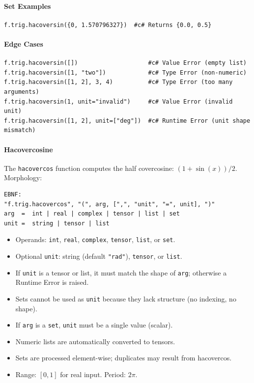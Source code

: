 \paragraph{Set Examples}
\begin{verbatim}
f.trig.hacoversin({0, 1.570796327})  #c# Returns {0.0, 0.5}
\end{verbatim}

\paragraph{Edge Cases}
\begin{verbatim}
f.trig.hacoversin([])                    #c# Value Error (empty list)
f.trig.hacoversin([1, "two"])            #c# Type Error (non-numeric)
f.trig.hacoversin([1, 2], 3, 4)          #c# Type Error (too many arguments)
f.trig.hacoversin(1, unit="invalid")     #c# Value Error (invalid unit)
f.trig.hacoversin([1, 2], unit=["deg"])  #c# Runtime Error (unit shape mismatch)
\end{verbatim}

\paragraph{Hacovercosine}
The \texttt{hacovercos} function computes the half covercosine: $(1 + \sin(x))/2$.\\
Morphology:
\begin{verbatim}
EBNF:
"f.trig.hacovercos", "(", arg, [",", "unit", "=", unit], ")"
arg  =  int | real | complex | tensor | list | set
unit =  string | tensor | list
\end{verbatim}
\begin{itemize}
\item Operands: \texttt{int}, \texttt{real}, \texttt{complex}, \texttt{tensor}, \texttt{list}, or \texttt{set}.
\item Optional \texttt{unit}: string (default \texttt{"rad"}), \texttt{tensor}, or \texttt{list}.
\item If \texttt{unit} is a tensor or list, it must match the shape of \texttt{arg}; otherwise a Runtime Error is raised.
\item Sets cannot be used as \texttt{unit} because they lack structure (no indexing, no shape).
\item If \texttt{arg} is a \texttt{set}, \texttt{unit} must be a single value (scalar).
\item Numeric lists are automatically converted to tensors.
\item Sets are processed element-wise; duplicates may result from hacovercos.
\item Range: $[0, 1]$ for real input. Period: $2\pi$.
\end{itemize}

